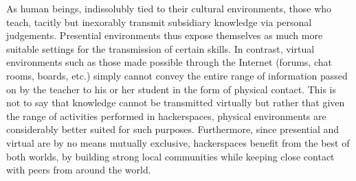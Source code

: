 As human beings, indissolubly tied to their cultural environments, those who teach, tacitly but inexorably transmit subsidiary knowledge via personal judgements. Presential environments thus expose themselves as much more suitable settings for the transmission of certain skills. In contrast, virtual environments such as those made possible through the Internet (forums, chat rooms, boards, etc.) simply cannot convey the entire range of information passed on by the teacher to his or her student in the form of physical contact. This is not to say that knowledge cannot be transmitted virtually but rather that given the range of activities performed in hackerspaces, physical environments are considerably better suited for such purposes. Furthermore, since presential and virtual are by no means mutually exclusive, hackerspaces benefit from the best of both worlds, by building strong local communities while keeping close contact with peers from around the world.





